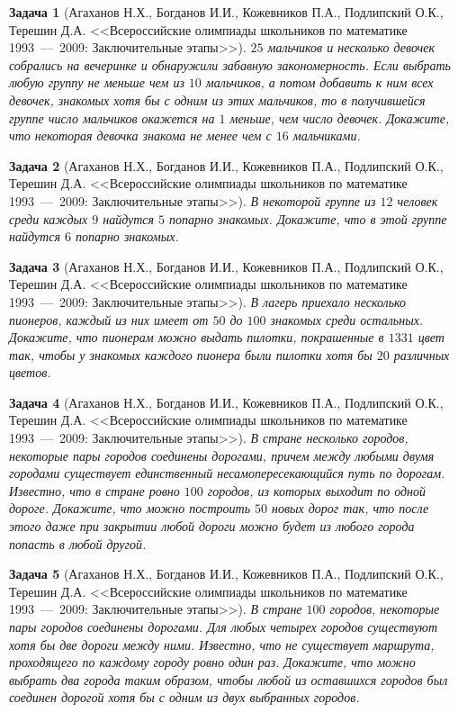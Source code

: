 \documentclass[12pt,a4paper,fleqn]{article}
\newtheorem{exersize}{Задача}
\begin{document}
\begin{exersize}[Агаханов Н.Х., Богданов И.И., Кожевников П.А., Подлипский О.К., Терешин Д.А. <<Всероссийские олимпиады школьников по математике 1993~---~2009: Заключительные этапы>>]
	$25$ мальчиков и несколько девочек собрались на вечеринке и обнаружили забавную закономерность. Если выбрать любую группу не меньше чем из $10$ мальчиков, а потом добавить к ним всех девочек, знакомых хотя бы с одним из этих мальчиков, то в получившейся группе число мальчиков окажется на $1$ меньше, чем число девочек. Докажите, что некоторая девочка знакома не менее чем с $16$ мальчиками.
\end{exersize}	 

\begin{exersize}[Агаханов Н.Х., Богданов И.И., Кожевников П.А., Подлипский О.К., Терешин Д.А. <<Всероссийские олимпиады школьников по математике 1993~---~2009: Заключительные этапы>>]
	В некоторой группе из $12$ человек среди каждых $9$ найдутся $5$ попарно знакомых. Докажите, что в этой группе найдутся $6$ попарно знакомых.
\end{exersize}	 

\begin{exersize}[Агаханов Н.Х., Богданов И.И., Кожевников П.А., Подлипский О.К., Терешин Д.А. <<Всероссийские олимпиады школьников по математике 1993~---~2009: Заключительные этапы>>]
	В лагерь приехало несколько пионеров, каждый из них имеет от $50$ до $100$ знакомых среди остальных. Докажите, что пионерам можно выдать пилотки, покрашенные в $1331$ цвет так, чтобы у знакомых каждого пионера были пилотки хотя бы $20$ различных цветов.
\end{exersize}	 


\begin{exersize}[Агаханов Н.Х., Богданов И.И., Кожевников П.А., Подлипский О.К., Терешин Д.А. <<Всероссийские олимпиады школьников по математике 1993~---~2009: Заключительные этапы>>]
	В стране несколько городов, некоторые пары городов соединены дорогами, причем между любыми двумя городами существует единственный несамопересекающийся путь по дорогам. Известно, что в стране ровно $100$ городов, из которых выходит по одной дороге. Докажите, что можно построить $50$ новых дорог так, что после этого даже при закрытии любой дороги можно будет из любого города попасть в любой другой.
\end{exersize}	 

\begin{exersize}[Агаханов Н.Х., Богданов И.И., Кожевников П.А., Подлипский О.К., Терешин Д.А. <<Всероссийские олимпиады школьников по математике 1993~---~2009: Заключительные этапы>>]
	В стране $100$ городов, некоторые пары городов соединены дорогами. Для любых четырех городов существуют хотя бы две дороги между ними. Известно, что не существует маршрута, проходящего по каждому городу ровно один раз. Докажите, что можно выбрать два города таким образом, чтобы любой из оставшихся городов был соединен дорогой хотя бы с одним из двух выбранных городов.
\end{exersize}	
\end{document}
